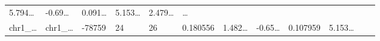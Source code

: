\documentclass[
]{article}
\begin{document}
\begin{longtable}[]{@{}llllllllllll@{}}
\begin{minipage}[t]{0.08\columnwidth}
5.794\ldots{}\strut
\end{minipage} & \begin{minipage}[t]{0.06\columnwidth}\raggedright
-0.69\ldots{}\strut
\end{minipage} & \begin{minipage}[t]{0.06\columnwidth}\raggedright
0.091\ldots{}\strut
\end{minipage} & \begin{minipage}[t]{0.09\columnwidth}\raggedright
5.153\ldots{}\strut
\end{minipage} & \begin{minipage}[t]{0.06\columnwidth}\raggedright
2.479\ldots{}\strut
\end{minipage} & \begin{minipage}[t]{0.02\columnwidth}\raggedright
\ldots{}\strut
\end{minipage}\tabularnewline
\begin{minipage}[t]{0.06\columnwidth}\raggedright
chr1\_\ldots{}\strut
\end{minipage} & \begin{minipage}[t]{0.06\columnwidth}\raggedright
chr1\_\ldots{}\strut
\end{minipage} & \begin{minipage}[t]{0.06\columnwidth}\raggedright
-78759\strut
\end{minipage} & \begin{minipage}[t]{0.06\columnwidth}\raggedright
24\strut
\end{minipage} & \begin{minipage}[t]{0.06\columnwidth}\raggedright
26\strut
\end{minipage} & \begin{minipage}[t]{0.06\columnwidth}\raggedright
0.180556\strut
\end{minipage} & \begin{minipage}[t]{0.08\columnwidth}\raggedright
1.482\ldots{}\strut
\end{minipage} & \begin{minipage}[t]{0.06\columnwidth}\raggedright
-0.65\ldots{}\strut
\end{minipage} & \begin{minipage}[t]{0.06\columnwidth}\raggedright
0.107959\strut
\end{minipage} & \begin{minipage}[t]{0.09\columnwidth}\raggedright
5.153\ldots{}\strut
\end{minipage} & \begin{minipage}[t]{0.06\columnwidth}\raggedright

\end{minipage}
\end{longtable}
\end{document}
